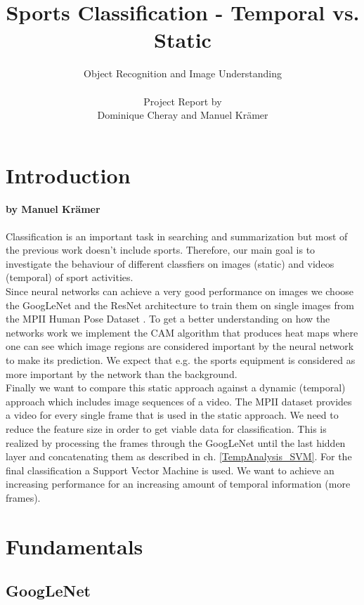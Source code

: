 \documentclass[11pt]{report}
\title{\textbf{Sports Classification - Temporal vs. Static}}
\author{Object Recognition and Image Understanding \\ \\
  Project Report by \\
  Dominique Cheray and Manuel Krämer}
\begin{document}
\maketitle

\tableofcontents
 
\chapter{Introduction}
\subsubsection{by Manuel Krämer}
Classification is an important task in searching and summarization but most of the previous work doesn't include sports. Therefore, our main goal is to investigate the behaviour of different classfiers on images (static) and videos (temporal) of sport activities. \\
Since neural networks can achieve a very good performance on images we choose
the GoogLeNet \cite{szegedy2015going} and the ResNet \cite{he2016deep}
architecture to train them on single images from the MPII Human Pose Dataset
\cite{andriluka20142d}. To get a better understanding on how the networks work
we implement the CAM algorithm \cite{zhou2016learning} that produces heat maps
where one can see which image regions are considered important by the neural
network to make its prediction. We expect that e.g. the sports equipment is considered as more important by the network than the background. \\
Finally we want to compare this static approach against a dynamic (temporal) approach which includes image sequences of a video. The MPII dataset provides a video for every single frame that is used in the static approach. We need to reduce the feature size in order to get viable data for classification. This is realized by processing the frames through the GoogLeNet until the last hidden layer and concatenating them as described in ch. \ref{TempAnalysis_SVM}. For the final classification a Support Vector Machine is used. We want to achieve an increasing performance for an increasing amount of temporal information (more frames).

\chapter{Fundamentals}
\section{GoogLeNet}
\end{document}
